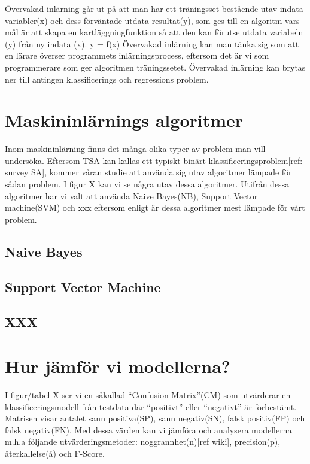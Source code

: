 \documentclass{kaumasters} %
\begin{document}
Övervakad inlärning går ut på att man har ett träningsset bestående utav indata variabler(x) och dess förväntade utdata resultat(y), som ges till en algoritm vars mål är att skapa en kartläggningfunktion så att den kan förutse utdata variabeln (y) från ny indata (x).
                        y = f(x)
Övervakad inlärning kan man tänka sig som att en lärare överser programmets inlärningsprocess, eftersom det är vi som programmerare som ger algoritmen träningssetet. Övervakad inlärning kan brytas ner till antingen klassificerings och regressions problem\cite{learning:001}.

\section{Maskininlärnings algoritmer}
Inom maskininlärning finns det många olika typer av problem man vill undersöka. Eftersom TSA kan kallas ett typiskt binärt klassificeringsproblem[ref: survey SA], kommer våran studie att använda sig utav algoritmer lämpade för sådan problem. I figur X kan vi se några utav dessa algoritmer. Utifrån dessa algoritmer har vi valt att använda Naive Bayes(NB), Support Vector machine(SVM) och xxx eftersom enligt \cite{TSAsurvey} är dessa algoritmer mest lämpade för vårt problem.
\subsection{Naive Bayes}
\subsection{Support Vector Machine}
\subsection{XXX}


\section{Hur jämför vi modellerna?}
I figur/tabel X ser vi en såkallad “Confusion Matrix”(CM)\cite{wiki:003} som utvärderar en klassificeringsmodell från testdata där “positivt” eller “negativt” är förbestämt. Matrisen visar antalet sann positiva(SP), sann negativ(SN), falsk positiv(FP) och falsk negativ(FN). Med dessa värden kan vi jämföra och analysera modellerna m.h.a följande utvärderingsmetoder: noggrannhet(n)[ref wiki], precision(p)\cite{wiki:002}, återkallelse(å)\cite{wiki:002} och F-Score\cite{wiki:001}.  
\end{document}
